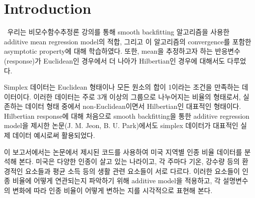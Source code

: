 \section{Introduction}
\label{sec:intro}

\ \quad 우리는 비모수함수추정론 강의를 통해 smooth backfitting 알고리즘을 사용한 additive mean regression model의 적합, 그리고 이 알고리즘의 convergence를 포함한 asymptotic property에 대해 학습하였다. 또한, mean을 추정하고자 하는 반응변수(response)가 Euclidean인 경우에서 더 나아가 Hilbertian인 경우에 대해서도 다루었다.

Simplex 데이터는 Euclidean 형태이나 모든 원소의 합이 1이라는 조건을 만족하는 데이터이다. 이러한 데이터는 주로 3개 이상의 그룹으로 나누어지는 비율의 형태로서, 실존하는 데이터 형태 중에서 non-Euclidean이면서 Hilbertian인 대표적인 형태이다. Hilbertian response에 대해 처음으로 smooth backfitting을 통한 additive regression model을 제시한 논문(J. M. Jeon, B. U. Park)에서도 simplex 데이터가 대표적인 실제 데이터 예시로써 활용되었다.

이 보고서에서는 논문에서 제시된 코드를 사용하여 미국 지역별 인종 비율 데이터를 분석해 본다. 미국은 다양한 인종이 살고 있는 나라이고, 각 주마다 기온, 강수량 등의 환경적인 요소들과 평균 소득 등의 생활 관련 요소들이 서로 다르다. 이러한 요소들이 인종 비율에 어떻게 연관되는지 파악하기 위해 additive model을 적용하고, 각 설명변수의 변화에 따라 인종 비율이 어떻게 변하는 지를 시각적으로 표현해 본다.